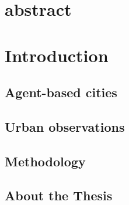 \chapter*{abstract}



\chapter{Introduction}


\section{Agent-based cities}




\section{Urban observations}




\section{Methodology}





\section{About the Thesis}